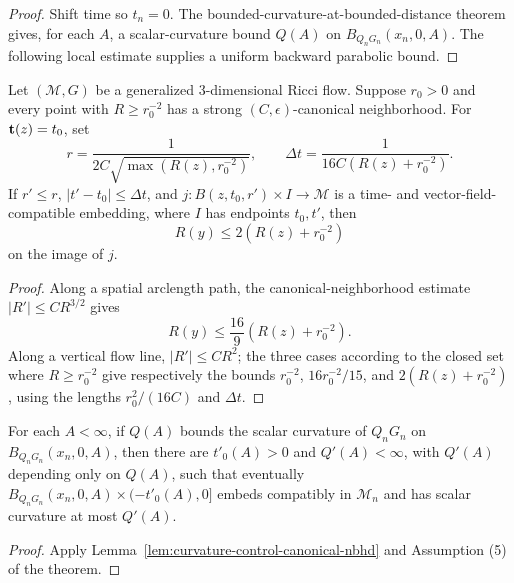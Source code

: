 \begin{proof}
\sketch Shift time so $t_n=0$. The bounded-curvature-at-bounded-distance
theorem gives, for each $A$, a scalar-curvature bound $Q(A)$ on
$B_{Q_nG_n}(x_n,0,A)$. The following local estimate supplies a uniform
backward parabolic bound.
\end{proof}

\begin{lemma}
\label{lem:curvature-control-canonical-nbhd}
\label{controlnbhd}
Let $({\mathcal M},G)$ be a generalized $3$-dimensional Ricci flow. Suppose
$r_0>0$ and every point with $R\ge r_0^{-2}$ has a strong
$(C,\epsilon)$-canonical neighborhood. For ${\bf t}(z)=t_0$, set
$$r=\frac{1}{2C\sqrt{\max(R(z),r_0^{-2})}},\qquad
\Delta t=\frac{1}{16C(R(z)+r_0^{-2})}.$$
If $r'\le r$, $|t'-t_0|\le\Delta t$, and
$j:B(z,t_0,r')\times I\to{\mathcal M}$ is a time- and vector-field-compatible
embedding, where $I$ has endpoints $t_0,t'$, then
$$R(y)\le2(R(z)+r_0^{-2})$$
on the image of $j$.
\end{lemma}

\begin{proof}
\sketch Along a spatial arclength path, the canonical-neighborhood estimate
$|R'|\le CR^{3/2}$ gives
\begin{equation}\label{Rineq}
R(y)\le\frac{16}{9}(R(z)+r_0^{-2}).
\end{equation}
Along a vertical flow line, $|R'|\le CR^2$; the three cases according to
the closed set where $R\ge r_0^{-2}$ give respectively the bounds
$r_0^{-2}$, $16r_0^{-2}/15$, and $2(R(z)+r_0^{-2})$, using the lengths
$r_0^2/(16C)$ and $\Delta t$.
\end{proof}

\begin{corollary}
\label{cor:uniform-backward-curvature-bound}
\label{cnnbhd2}

For each $A<\infty$, if $Q(A)$ bounds the scalar curvature of
$Q_nG_n$ on $B_{Q_nG_n}(x_n,0,A)$, then there are $t'_0(A)>0$ and
$Q'(A)<\infty$, with $Q'(A)$ depending only on $Q(A)$, such that eventually
$B_{Q_nG_n}(x_n,0,A)\times(-t'_0(A),0]$ embeds compatibly in
${\mathcal M}_n$ and has scalar curvature at most $Q'(A)$.
\end{corollary}
\begin{proof}\sketch Apply Lemma~\ref{lem:curvature-control-canonical-nbhd} and
Assumption (5) of the theorem.\end{proof}

